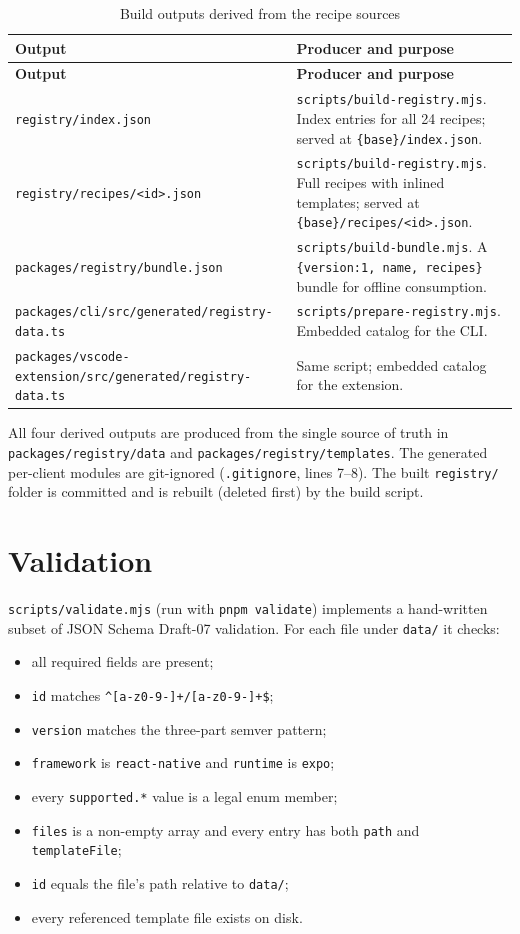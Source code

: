 \begin{longtable}{@{}L{4.6cm}L{9.4cm}@{}}
\caption{Build outputs derived from the recipe sources}\\
\toprule
\textbf{Output} & \textbf{Producer and purpose} \\
\midrule
\endfirsthead
\toprule
\textbf{Output} & \textbf{Producer and purpose} \\
\midrule
\endhead
\texttt{registry/index.json} & \texttt{scripts/build-registry.mjs}. Index entries for
all 24 recipes; served at \texttt{\{base\}/index.json}. \\
\texttt{registry/recipes/<id>.json} & \texttt{scripts/build-registry.mjs}. Full
recipes with inlined templates; served at \texttt{\{base\}/recipes/<id>.json}. \\
\texttt{packages/registry/bundle.json} & \texttt{scripts/build-bundle.mjs}. A
\texttt{\{version:1, name, recipes\}} bundle for offline consumption. \\
\texttt{packages/cli/src/generated/registry-data.ts} & \texttt{scripts/prepare-registry.mjs}.
Embedded catalog for the CLI. \\
\texttt{packages/vscode-extension/src/generated/registry-data.ts} & Same script;
embedded catalog for the extension. \\
\bottomrule
\end{longtable}

All four derived outputs are produced from the single source of truth in
\texttt{packages/registry/data} and \texttt{packages/registry/templates}. The
generated per-client modules are git-ignored
(\texttt{.gitignore}, lines 7--8). The built \texttt{registry/} folder is committed
and is rebuilt (deleted first) by the build script.

\section{Validation}

\texttt{scripts/validate.mjs} (run with \texttt{pnpm validate}) implements a
hand-written subset of JSON Schema Draft-07 validation. For each file under
\texttt{data/} it checks:

\begin{itemize}
  \item all required fields are present;
  \item \texttt{id} matches \texttt{\^{}[a-z0-9-]+/[a-z0-9-]+\$};
  \item \texttt{version} matches the three-part semver pattern;
  \item \texttt{framework} is \texttt{react-native} and \texttt{runtime} is
        \texttt{expo};
  \item every \texttt{supported.*} value is a legal enum member;
  \item \texttt{files} is a non-empty array and every entry has both \texttt{path}
        and \texttt{templateFile};
  \item \texttt{id} equals the file's path relative to \texttt{data/};
  \item every referenced template file exists on disk.
\end{itemize}

